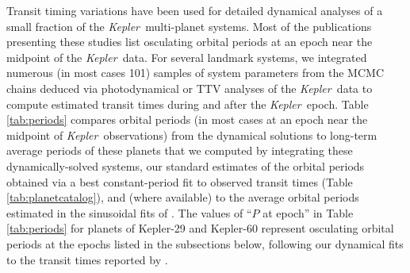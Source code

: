 \documentclass{aastex62}
\newcommand{\ik}{{\it Kepler~}}
\begin{document}
Transit timing variations have been used for detailed dynamical analyses of a small fraction of the \ik multi-planet systems.  Most of the publications presenting these studies list osculating orbital periods at an epoch near the midpoint of the \ik data.  For several landmark systems, we integrated numerous (in most cases 101) samples of system parameters from the MCMC chains deduced via photodynamical or TTV analyses of the \ik data to compute estimated transit times during and after the \ik epoch.  Table \ref{tab:periods} compares orbital periods (in most cases at an epoch near the midpoint of \ik observations) from the dynamical solutions to long-term average periods of these planets that we computed by integrating these dynamically-solved systems, our standard estimates of the orbital periods obtained via a best constant-period fit to observed transit times (Table \ref{tab:planetcatalog}), and  (where available) to the average  orbital periods estimated in the sinusoidal fits of \citet{Holczer:2016}. The values of ``$P$ at epoch'' in Table \ref{tab:periods} for planets of Kepler-29 and Kepler-60 represent osculating orbital periods at the epochs listed in the subsections below, following our dynamical fits to the transit times reported by \citet{Rowe:2015b}.
\end{document}
